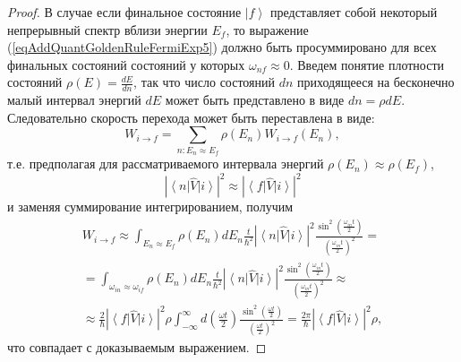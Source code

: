 \begin{proof}
  В случае если финальное состояние $\left|f\right>$ представляет
  собой некоторый непрерывный спектр вблизи энергии $E_f$, то
  выражение (\ref{eqAddQuantGoldenRuleFermiExp5}) должно быть
  просуммировано для всех финальных состояний состояний у которых
  $\omega_{nf} \approx 0$. Введем понятие плотности состояний
  $\rho(E) = \frac{dE}{dn}$, так что число состояний $dn$ приходящееся
  на бесконечно малый интервал энергий $dE$ может быть представлено в
  виде $dn = \rho dE$. Следовательно скорость перехода может быть
  переставлена в виде:
  \begin{equation}
    W_{i \rightarrow f} = \sum_{n: E_n \approx E_f}
    \rho\left(E_n\right) W_{i \rightarrow f}\left(E_n\right), 
    \nonumber
  \end{equation}
  т.е. предполагая для рассматриваемого интервала энергий
  $\rho\left(E_n\right) \approx \rho\left(E_f\right)$,
  \[
  \left|\left<n\right|\hat{V}\left|i\right>\right|^2 \approx
  \left|\left<f\right|\hat{V}\left|i\right>\right|^2
  \]
  и заменяя суммирование интегрированием, получим
  \begin{eqnarray}
    W_{i \rightarrow f} \approx
    \int_{E_n \approx E_f} \rho\left(E_n\right) d E_n      \frac{t}{\hbar^2}
    \left|\left<n\right|\hat{V}\left|i\right>\right|^2
    \frac{\sin^2\left(\frac{ \omega_{in} t}{2}\right)}
         {\left(\frac{ \omega_{in} t}{2}\right)^2} =
         \\ \nonumber
         = \int_{\omega_{in} \approx \omega_{if}} \rho\left(E_n\right)
         d E_n      \frac{t}{\hbar^2}
    \left|\left<n\right|\hat{V}\left|i\right>\right|^2
    \frac{\sin^2\left(\frac{ \omega_{in} t}{2}\right)}
         {\left(\frac{ \omega_{in} t}{2}\right)^2} \approx
         \\ \nonumber
    \approx
    \frac{2}{\hbar}
    \left|\left<f\right|\hat{V}\left|i\right>\right|^2 \rho
    \int_{-\infty}^{\infty}
     d \left(\frac{ \omega t}{2}\right)
    \frac{\sin^2\left(\frac{ \omega t}{2}\right)}
         {\left(\frac{ \omega t}{2}\right)^2} =
    \frac{2 \pi}{\hbar} 
    \left|\left<f\right|\hat{V}\left|i\right>\right|^2 \rho,
    \label{eqAddQuantGoldenRuleFermiExp6}
  \end{eqnarray}
  что совпадает с доказываемым выражением.
  
  
\end{proof}

